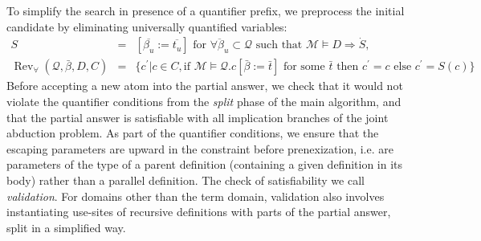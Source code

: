 \documentclass{article}
\newcommand{\assign}{:=}
\newcommand{\tmem}[1]{{\em #1\/}}
\newcommand{\tmop}[1]{\ensuremath{\operatorname{#1}}}
\begin{document}
To simplify the search in presence of a quantifier prefix, we preprocess the
initial candidate by eliminating universally quantified variables:
\begin{eqnarray*}
  S & = & [\overline{\beta_u} \assign \overline{t_u}] \text{ for }
  \overline{\forall \beta_u} \subset \mathcal{Q} \text{ such that }
  \mathcal{M} \vDash D \Rightarrow \dot{S},\\
  \tmop{Rev}_{\forall} (\mathcal{Q}, \bar{\beta}, D, C) & = & \{ c^{\prime} |
  c \in C, \text{if } \mathcal{M} \vDash \mathcal{Q}.c [\bar{\beta} \assign
  \bar{t}] \text{ for some } \bar{t} \text{ then } c^{\prime} = c \text{ else
  } c^{\prime} = S (c) \}
\end{eqnarray*}
Before accepting a new atom into the partial answer, we check that it would
not violate the quantifier conditions from the {\tmem{split}} phase of the
main algorithm, and that the partial answer is satisfiable with all
implication branches of the joint abduction problem. As part of the quantifier
conditions, we ensure that the escaping parameters are upward in the
constraint before prenexization, i.e. are parameters of the type of a parent
definition (containing a given definition in its body) rather than a parallel
definition. The check of satisfiability we call {\tmem{validation}}. For
domains other than the term domain, validation also involves instantiating
use-sites of recursive definitions with parts of the partial answer, split in
a simplified way.
\end{document}
